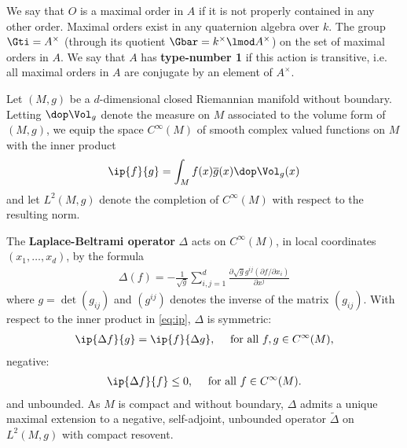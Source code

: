 We say that $O$ is a maximal order in $A$ if it is not properly contained in any other order. Maximal orders exist in any quaternion algebra over $k$. The group $\Gti = A^\times$ (through its quotient $\Gbar = k^\times \lmod A^\times$) on the set of maximal orders in $A$. We say that $A$ has  \textbf{type-number 1} if this action is transitive, i.e. all maximal orders in $A$ are conjugate by an element of $A^\times$.






\newpage
Let $(M,g)$ be a $d$-dimensional closed Riemannian manifold without boundary.  Letting $\dop \Vol_g$ denote the measure on $M$ associated to the volume form of $(M,g)$, we equip the space $C^\infty(M)$ of smooth complex valued functions on $M$ with the inner product
\begin{align}\label{eq:ip}
    \ip{f}{g} = \int_M f(x) \overline{g}(x) \dop \Vol_g(x)
\end{align}
and let $L^2(M,g)$ denote the completion of $C^\infty(M)$ with respect to the resulting norm.

The \textbf{Laplace-Beltrami operator} $\Delta$ acts on $C^\infty(M)$, in local coordinates $(x_1,\dots,x_d)$, by the formula
\begin{align}
    \Delta(f) = -\frac{1}{\sqrt{g}} \sum_{i,j=1}^d \frac{\partial \sqrt{g} g^{ij} (\partial f / \partial x_i)}{\partial x^j}
\end{align}
where $g = \det(g_{ij})$ and $(g^{ij})$ denotes the inverse of the matrix $(g_{ij})$. With respect to the inner product in \ref{eq:ip}, $\Delta$ is symmetric:
\begin{align*}
    \ip{\Delta f}{g} =\ip{ f}{\Delta g}, \quad \text{ for all $f,g \in C^\infty(M)$,}
\end{align*}
negative:
\begin{align*}
    \ip{\Delta f }{f} \leq 0, \quad \text{ for all $f \in C^\infty(M)$.}
\end{align*}
and unbounded. As $M$ is compact and without boundary, $\Delta$ admits a unique maximal extension to a negative, self-adjoint, unbounded operator  $\tilde{\Delta}$ on $L^2(M,g)$ with compact resovent.

